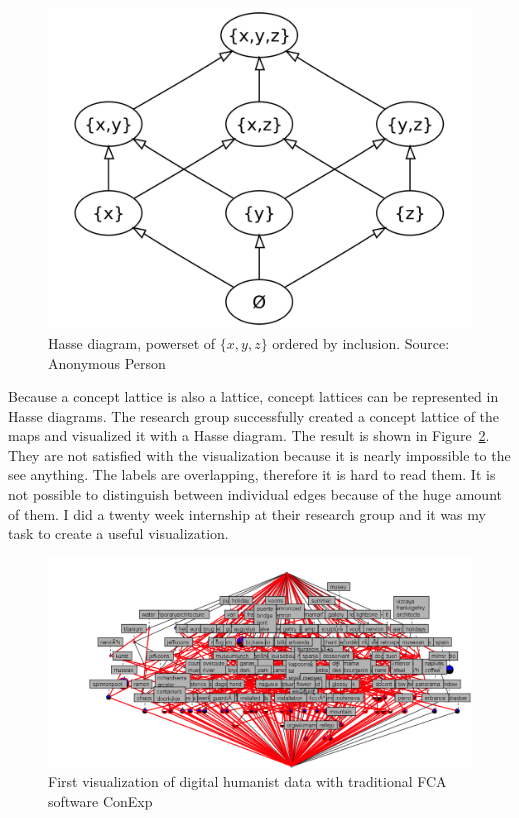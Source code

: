 \documentclass[11pt]{report}
\begin{document}
\begin{figure}[!ht]
	\centering
	\includegraphics[width=\linewidth]{./images/hasse}
\caption{Hasse diagram, powerset of $\{x,y,z\}$ ordered by inclusion. Source: Anonymous Person \cite{hassediagramfig}}
\label{figure:hasse}
\end{figure}

Because a concept lattice is also a lattice, concept lattices can be represented in Hasse diagrams. The research group successfully created a concept lattice of the maps and visualized it with a Hasse diagram. The result is shown in Figure~\ref{figure:firstVisualizaion}. They are not satisfied  with the visualization because it is nearly impossible to the see anything. The labels are overlapping, therefore it is hard to read them. It is not possible to distinguish between individual edges because of the huge amount of them. I did a twenty week internship at their research group and it was my task to create a useful visualization. \\

\begin{figure}[!ht]
	\centering
	\includegraphics[width=\linewidth]{./images/firstVisualization}
\caption{First visualization of digital humanist data with traditional FCA software ConExp}
\label{figure:firstVisualizaion}
\end{figure}
\end{document}

